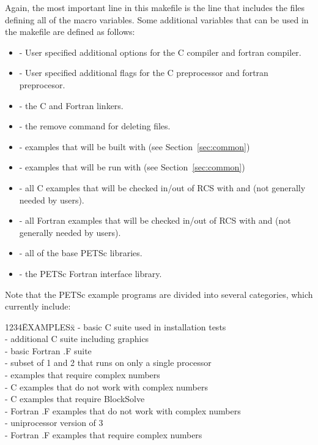 Again, the most important line in this makefile is the 
line that includes the files defining all of the macro variables.
Some additional variables that can be used in the makefile are defined
as follows:
\begin{itemize}
\item {} - User specified additional options for the C compiler and
        fortran compiler.
\item {} - User specified additional flags for the C preprocessor
        and fortran preprocesor.
\item {} - the C and Fortran linkers. 
\item {} - the remove command for deleting files.
\item {} - examples that will be built with
              (see Section~\ref{sec:common})
\item {} - examples that will be run with
              (see Section~\ref{sec:common})
\item {} - all C examples that will be checked in/out of RCS
             with  and  (not generally
             needed by users).
\item {} - all Fortran examples that will be checked in/out of
             RCS with  and  (not generally
             needed by users).
\item {} - all of the base PETSc libraries.
\item {} - the PETSc Fortran interface 
             library. 
\end{itemize}
Note that the PETSc example programs are divided into several
categories, which currently include: 
\begin{tabbing}
1234\= EXAMPLESx\= \kill
\>  \> - basic C suite used in installation tests\\
\>  \> - additional C suite including graphics\\
\>  \> - basic Fortran .F suite\\
\>  \> - subset of 1 and 2 that runs on only a single processor\\
\>  \> - examples that require complex numbers\\
\>  \> - C examples that do not work with complex numbers\\
\>  \> - C examples that require BlockSolve\\
\>  \> - Fortran .F examples that do not work with complex numbers\\
\>  \> - uniprocessor version of 3\\
\>  \> - Fortran .F examples that require complex numbers\\
\end{tabbing}

